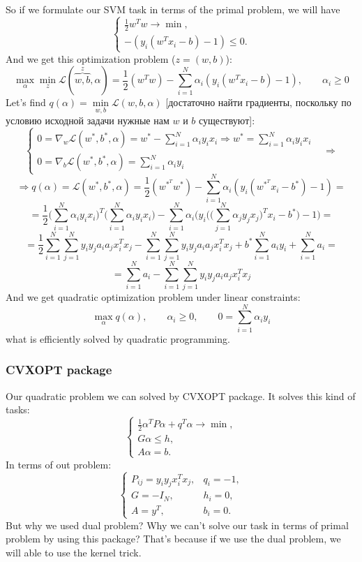 So if we formulate our SVM task in terms of the primal problem, we will have
$$\begin{cases}
	\frac{1}{2}w^Tw\to\min, \\
	-(y_i(w^Tx_i-b)-1)\le0.
\end{cases}$$
And we get this optimization problem ($z=(w,b)$):
$$\max\limits_{\alpha}\min\limits_{z}\mathcal{L}(\overbrace{w,b}^z,\alpha)=\frac{1}{2}(w^Tw)-\sum\limits_{i=1}^{N}\alpha_i(y_i(w^Tx_i-b)-1),\qquad\alpha_i\ge0$$
Let's find $q(\alpha)=\min\limits_{w,b}\mathcal{L}(w,b,\alpha)$ [достаточно найти градиенты, поскольку по условию исходной задачи нужные нам $w$ и $b$ существуют]:
$$\begin{cases}
	0=\nabla_w\mathcal{L}(w^*,b^*,\alpha)=w^*-\sum\limits_{i=1}^{N}\alpha_iy_ix_i\Rightarrow w^*=\sum\limits_{i=1}^{N}\alpha_iy_ix_i &  \\
	0=\nabla_b\mathcal{L}(w^*,b^*,\alpha)=\sum\limits_{i=1}^{N}\alpha_iy_i & 
\end{cases}\Longrightarrow$$
$$\Longrightarrow q(\alpha)=\mathcal{L}(w^*,b^*,\alpha)=\frac{1}{2}(w^{*^T}w^*)-\sum\limits_{i=1}^{N}\alpha_i(y_i(w^{*^T}x_i-b^*)-1)=$$
$$=\frac{1}{2}\Big(\sum\limits_{i=1}^{N}\alpha_iy_ix_i\Big)^T\Big(\sum\limits_{i=1}^{N}\alpha_iy_ix_i\Big)-\sum\limits_{i=1}^{N}\alpha_i\big(y_i\Big(\Big(\sum\limits_{j=1}^{N}\alpha_jy_jx_j\Big)^Tx_i-b^*\Big)-1\big)=$$
$$=\frac{1}{2}\sum\limits_{i=1}^{N}\sum\limits_{j=1}^{N}y_iy_ja_ia_jx_i^Tx_j-\sum\limits_{i=1}^{N}\sum\limits_{j=1}^{N}y_iy_ja_ia_jx_i^Tx_j+b^*\sum\limits_{i=1}^{N}a_iy_i+\sum\limits_{i=1}^{N}a_i=$$
$$=\sum\limits_{i=1}^{N}a_i-\sum\limits_{i=1}^{N}\sum\limits_{j=1}^{N}y_iy_ja_ia_jx_i^Tx_j$$
And we get quadratic optimization problem under linear constraints:
$$\max\limits_{\alpha}q(\alpha),\qquad\alpha_i\ge0,\qquad 0=\sum\limits_{i=1}^{N}\alpha_iy_i$$
what is efficiently solved by quadratic programming.

\subsubsection*{CVXOPT package}

Our quadratic problem we can solved by CVXOPT package. It solves this kind of tasks:
$$\begin{cases}
	\frac{1}{2}\alpha^TP\alpha+q^T\alpha\to\min,\\
	G\alpha\le h, \\
	A\alpha=b.
\end{cases}$$
In terms of out problem:
$$\begin{cases}
	P_{ij}=y_iy_jx_i^Tx_j, & q_i=-1, \\
	G=-I_N, & h_i = 0, \\
	A=y^T, & b_i = 0.
\end{cases}$$
But why we used dual problem? Why we can't solve our task in terms of primal problem by using this package? That's because if we use the dual problem, we will able to use the kernel trick.

